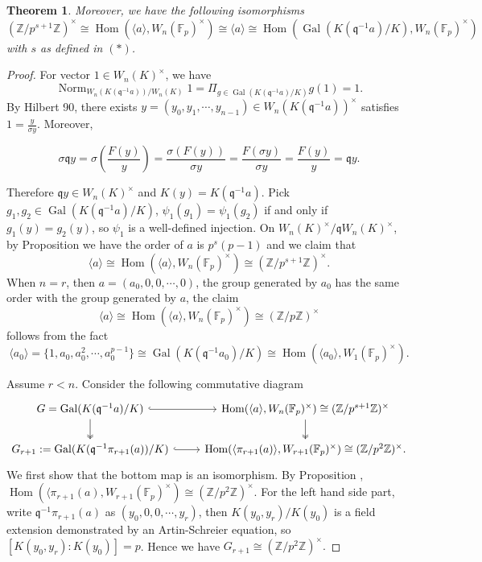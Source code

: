 \documentclass{proc-l}
\newtheorem{theorem}{Theorem}[section]
\theoremstyle{definition}
\theoremstyle{remark}
\numberwithin{equation}{section}
\DeclareMathOperator{\Gal}{Gal}
\DeclareMathOperator{\Hom}{Hom}
\DeclareMathOperator{\Norm}{Norm}
\begin{document}
{\begin{theorem}{\label{038}}
Moreover, we have the following isomorphisms
$$(\mathbb Z/p^{s+1}\mathbb Z)^\times\cong \Hom(\langle a\rangle,W_n(\mathbb F_p)^\times)\cong\langle a\rangle\cong \Hom(\Gal(K(\mathfrak q^{-1}a)/K),W_n(\mathbb F_p)^\times)$$
with $s$ as defined in $(*)$.
\end{theorem}
\begin{proof}
For vector $1\in W_n(K)^\times$, we have $$\Norm_{W_n(K(\mathfrak q^{-1}a))/W_n(K)}1=\Pi_{g\in \Gal(K(\mathfrak q^{-1}a)/K)}g(1)=1.$$ 
By Hilbert 90, there exists $y=(y_0,y_1,\cdots,y_{n-1})\in W_n(K(\mathfrak q^{-1}a))^\times$ satisfies $1=\frac{y}{\sigma y}$. Moreover,

$$\sigma\mathfrak q y=\sigma(\frac{F(y)}{y})
=\frac{\sigma(F(y))}{\sigma y}
=\frac{F(\sigma y)}{\sigma y}
=\frac{F(y)}{y}
=\mathfrak qy.$$

Therefore $\mathfrak qy\in W_n(K)^\times$ and $K(y)=K(\mathfrak q^{-1}a)$.
Pick  $g_1, g_2\in \Gal(K(\mathfrak q^{-1}a)/K)$, 
$\psi_1(g_1)=\psi_1(g_2)$ if and only if $g_1(y)=g_2(y)$, so $\psi_1$ is a well-defined injection. On $W_n(K)^\times/\mathfrak qW_n(K)^\times$, by Proposition \boxed{\ref{thm1}} we have the order of $a$ is $p^{s}(p-1)$ and we claim that $$\langle a\rangle\cong \Hom(\langle a\rangle, W_{n}(\mathbb F_p)^\times)\cong(\mathbb Z/p^{s+1}\mathbb Z)^\times.$$  When $n=r$, then $a=(a_0,0,0,\cdots,0)$, the group generated by  $a_0$ has the same order with the group generated by $a$, the claim
$$\langle a\rangle\cong \Hom(\langle a\rangle, W_{n}(\mathbb F_p)^\times)\cong(\mathbb Z/p\mathbb Z)^\times$$ 
follows from the fact $$\langle a_0\rangle=\{1,a_0,a_0^2,\cdots,a_0^{p-1}\}\cong \Gal(K(\mathfrak q^{-1}a_0)/K)\cong \Hom(\langle a_0\rangle,W_1(\mathbb F_p)^\times).$$

Assume $r<n$. Consider the following commutative diagram
$$\begin{tikzcd}
  G=\Gal(K(\mathfrak q^{-1}a)/K) \arrow[r, hook] \arrow[d, two heads]
    & \Hom(\langle a\rangle,W_n(\mathbb F_p)^\times)\cong(\mathbb Z/p^{s+1}\mathbb Z)^\times \arrow[d, two heads ] \\
  G_{r+1}:=\Gal(K(\mathfrak q^{-1}\pi_{r+1}(a))/K) \arrow[r, hook ]
& |[]| \Hom(\langle \pi_{r+1}(a)\rangle,W_{r+1}(\mathbb F_p)^\times)\cong (\mathbb Z/p^2\mathbb Z)^\times.
\end{tikzcd}$$
We first show that the bottom map is an isomorphism. By Proposition \boxed{\ref{thm1}}, $\Hom(\langle\pi_{r+1}(a),W_{r+1}(\mathbb F_p)^\times)\cong(\mathbb Z/p^2\mathbb Z)^\times$. For the left hand side part, write $\mathfrak q^{-1}\pi_{r+1}(a)$ as $(y_0,0,0,\cdots,y_r)$, then $K(y_0, y_r)/K(y_0)$ is a field extension demonstrated by an Artin-Schreier equation, so $[K(y_0,y_r):K(y_0)]=p$. Hence we have $G_{r+1}\cong(\mathbb Z/p^2\mathbb Z)^\times.$ 


\end{proof}}
\end{document}

